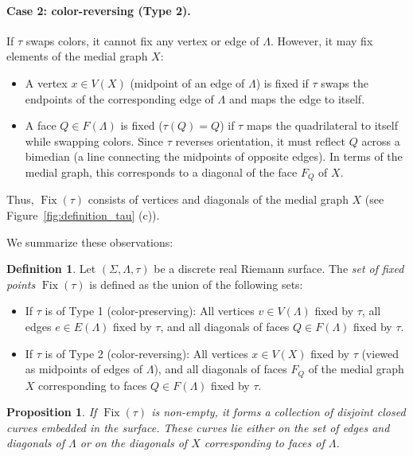 \documentclass[11pt,a4paper]{article}
\newtheorem{proposition}[theorem]{Proposition}
\theoremstyle{definition}
\newtheorem*{definition}{Definition}
\DeclareMathOperator{\fix}{\mathrm{Fix}}
\begin{document}
\paragraph{Case 2: color-reversing (Type 2).}
If $\tau$ swaps colors, it cannot fix any vertex or edge of $\Lambda$. However, it may fix elements of the medial graph $X$:
\begin{itemize}
	\item A vertex $x \in V(X)$ (midpoint of an edge of $\Lambda$) is fixed if $\tau$ swaps the endpoints of the corresponding edge of $\Lambda$ and maps the edge to itself.
	\item A face $Q \in F(\Lambda)$ is fixed ($\tau(Q)=Q$) if $\tau$ maps the quadrilateral to itself while swapping colors. Since $\tau$ reverses orientation, it must reflect $Q$ across a bimedian (a line connecting the midpoints of opposite edges). In terms of the medial graph, this corresponds to a diagonal of the face $F_Q$ of $X$.
\end{itemize}
Thus, $\fix(\tau)$ consists of vertices and diagonals of the medial graph $X$ (see Figure~\ref{fig:definition_tau} (c)).

We summarize these observations:

\begin{definition}
	Let $(\Sigma, \Lambda, \tau)$ be a discrete real Riemann surface. The \textit{set of fixed points} $\fix(\tau)$ is defined as the union of the following sets:
	\begin{itemize}
		\item If $\tau$ is of Type 1 (color-preserving): All vertices $v \in V(\Lambda)$ fixed by $\tau$, all edges $e \in E(\Lambda)$ fixed by $\tau$, and all diagonals of faces $Q \in F(\Lambda)$ fixed by $\tau$.
		\item If $\tau$ is of Type 2 (color-reversing): All vertices $x \in V(X)$ fixed by $\tau$ (viewed as midpoints of edges of $\Lambda$), and all diagonals of faces $F_Q$ of the medial graph $X$ corresponding to faces $Q \in F(\Lambda)$ fixed by $\tau$.
	\end{itemize}
\end{definition}

\begin{proposition}\label{prop:fixedpoint2}
	If $\fix(\tau)$ is non-empty, it forms a collection of disjoint closed curves embedded in the surface. These curves lie either on the set of edges and diagonals of $\Lambda$ or on the diagonals of $X$ corresponding to faces of $\Lambda$.
\end{proposition}
\end{document}
